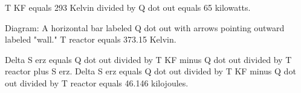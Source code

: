 T KF equals 293 Kelvin divided by Q dot out equals 65 kilowatts.  

Diagram:  
A horizontal bar labeled Q dot out with arrows pointing outward labeled "wall."  
T reactor equals 373.15 Kelvin.  

Delta S erz equals Q dot out divided by T KF minus Q dot out divided by T reactor plus S erz.  
Delta S erz equals Q dot out divided by T KF minus Q dot out divided by T reactor equals 46.146 kilojoules.